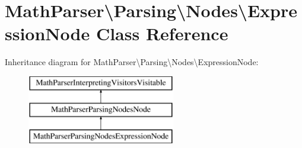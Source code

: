 \hypertarget{classMathParser_1_1Parsing_1_1Nodes_1_1ExpressionNode}{\section{Math\-Parser\textbackslash{}Parsing\textbackslash{}Nodes\textbackslash{}Expression\-Node Class Reference}
\label{classMathParser_1_1Parsing_1_1Nodes_1_1ExpressionNode}
}
Inheritance diagram for Math\-Parser\textbackslash{}Parsing\textbackslash{}Nodes\textbackslash{}Expression\-Node\-:\begin{figure}[H]
\begin{center}
\leavevmode
\includegraphics[height=3.000000cm]{classMathParser_1_1Parsing_1_1Nodes_1_1ExpressionNode}
\end{center}
\end{figure}
